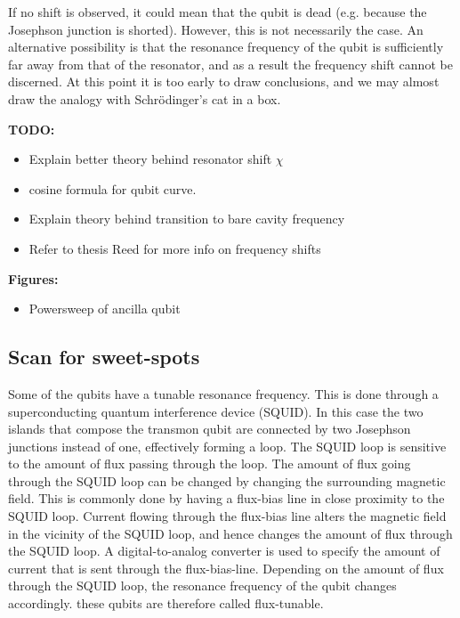 \documentclass[12pt]{report}
\begin{document}
        If no shift is observed, it could mean that the qubit is dead (e.g. because the Josephson junction is shorted). However, this is not necessarily the case. An alternative possibility is that the resonance frequency of the qubit is sufficiently far away from that of the resonator, and as a result the frequency shift cannot be discerned. At this point it is too early to draw conclusions, and we may almost draw the analogy with Schr\"odinger's cat in a box.

        \textbf{TODO:}
        \begin{itemize}
          \item Explain better theory behind resonator shift $\chi$
          \item cosine formula for qubit curve.
          \item Explain theory behind transition to bare cavity frequency
          \item Refer to thesis Reed for more info on frequency shifts
        \end{itemize}

        \textbf{Figures:}
        \begin{itemize}
          \item Powersweep of ancilla qubit
        \end{itemize}

      \subsection{Scan for sweet-spots}
        Some of the qubits have a tunable resonance frequency. This is done through a superconducting quantum interference device (SQUID). In this case the two islands that compose the transmon qubit are connected by two Josephson junctions instead of one, effectively forming a loop. The SQUID loop is sensitive to the amount of flux passing through the loop. The amount of flux going through the SQUID loop can be changed by changing the surrounding magnetic field. This is commonly done by having a flux-bias line in close proximity to the SQUID loop. Current flowing through the flux-bias line alters the magnetic field in the vicinity of the SQUID loop, and hence changes the amount of flux through the SQUID loop. A digital-to-analog converter is used to specify the amount of current that is sent through the flux-bias-line. Depending on the amount of flux through the SQUID loop, the resonance frequency of the qubit changes accordingly. these qubits are therefore called flux-tunable.
\end{document}
